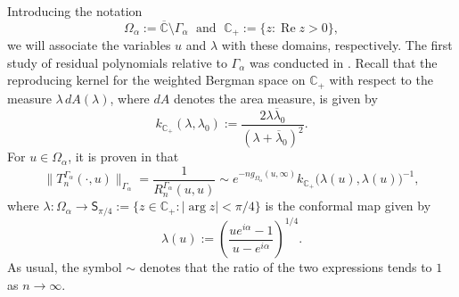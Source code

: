 \documentclass[12pt,oneside,reqno]{amsart}
\theoremstyle{definition}
\numberwithin{equation}{section}
\newcommand{\C}{{\mathbb C}}
\newcommand{\RS}{\overline{\C}}
\renewcommand{\Re}{\operatorname{Re}}
\begin{document}
Introducing the notation 
\begin{equation}
   \Omega_\alpha := \RS\setminus \Gamma_\alpha
   \; \mbox{ and } \; 
   \C_+ := \{z:\Re z>0\},
\end{equation}    
we will associate the variables $u$ and $\lambda$ with these domains, respectively. 
The first study of residual polynomials relative to $\Gamma_\alpha$ was conducted in \cite{eichinger17}. Recall that the reproducing kernel for the weighted Bergman space on $\C_+$ with respect to the measure $\lambda\,  dA(\lambda)$, where $dA$ denotes the area measure, is given by
\begin{equation}
   k_{\C_+}(\lambda,\lambda_0) := \frac{2\lambda\overline{\lambda}_0}{(\lambda+\overline{\lambda}_0)^2}.
\end{equation}
For $u\in \Omega_\alpha$, it is proven in \cite[Theorem 1.3]{eichinger17} that  %
\begin{equation}
	\|T_n^{\Gamma_\alpha}(\cdot,u)\|_{\Gamma_\alpha} = \frac{1}{R_n^{\Gamma_\alpha}(u,u)} \sim e^{-ng_{\Omega_\alpha}(u,\infty)}k_{\C_+}\bigl(\lambda(u),\lambda(u)\bigr)^{-1},
	\label{eq:eichinger_asymptotics}
\end{equation}
where $\lambda:\Omega_\alpha\rightarrow \mathsf{S}_{\pi/4}:=\{z\in \C_+: |\arg z|< \pi/4\}$ is the conformal map given by
\begin{equation}
\label{la}
   \lambda(u) := \left(\frac{ue^{i\alpha}-1}{u-e^{i\alpha}}\right)^{1/4}.
\end{equation}  
As usual, the symbol $\sim$ denotes that the ratio of the two expressions tends to $1$ as $n\rightarrow \infty$. 
\end{document}
